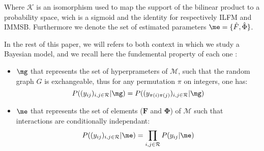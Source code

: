 Where $\mathcal{K}$ is an isomorphism used to map the support of the bilinear product to a probability space, wich is a sigmoid and the identity for respectively ILFM and IMMSB. Furthermore we denote the set of estimated parameters $\me = \{\hat F,  \hat \Phi \}$.


In the rest of this paper, we will refers to both context in which we study a Bayesian model, and we recall here the fundemental property of each one :
\begin{itemize}
    \item $\mg$ that represents the set of hyperprameters of $\mathcal{M}$, such that the random graph $G$ is exchangeable, thus for any permutation $\pi$ on integers, one has: \[ P((y_{ij})_{i,j\in \mathcal{R}} | \mg) = P((y_{\pi(i)\pi(j)})_{i,j\in \mathcal{R}} | \mg) \]
    \item $\me$ that represents the set of elements ($\bm{F}$ and $\bm{\Phi}$) of $\mathcal{M}$ such that interactions are conditionally independant:  \[P((y_{ij})_{i,j\in \mathcal{R}} | \me) = \prod_{i,j\in \mathcal{R}} P(y_{ij} | \me)  \]
\end{itemize}

%
%
%
%


%
%
%
%



